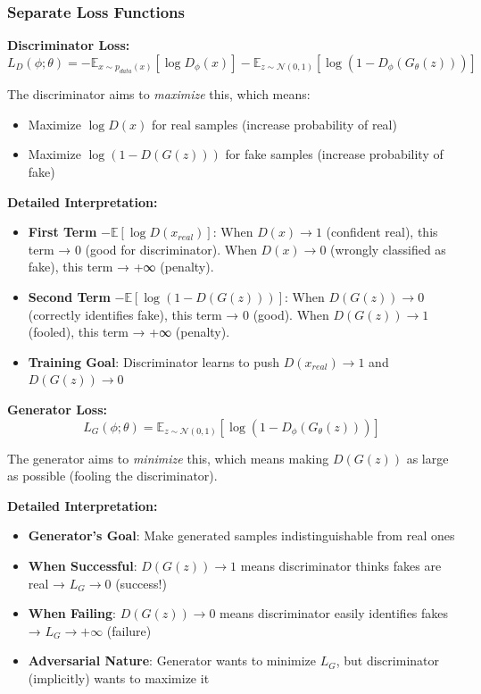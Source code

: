 \documentclass[conference,12pt]{IEEEtran}
\begin{document}
\subsubsection{Separate Loss Functions}

\textbf{Discriminator Loss:}
\begin{equation}
    L_D(\phi; \theta) = - \mathbb{E}_{x \sim p_{data}(x)}[\log D_\phi(x)] - \mathbb{E}_{z \sim \mathcal{N}(0,1)}[\log(1 - D_\phi(G_\theta(z)))]
\end{equation}

The discriminator aims to \textit{maximize} this, which means:
\begin{itemize}
    \item Maximize $\log D(x)$ for real samples (increase probability of real)
    \item Maximize $\log(1-D(G(z)))$ for fake samples (increase probability of fake)
\end{itemize}

\textbf{Detailed Interpretation:}
\begin{itemize}
    \item \textbf{First Term} $-\mathbb{E}[\log D(x_{real})]$: When $D(x) \to 1$ (confident real), this term → 0 (good for discriminator). When $D(x) \to 0$ (wrongly classified as fake), this term → +∞ (penalty).
    \item \textbf{Second Term} $-\mathbb{E}[\log(1-D(G(z)))]$: When $D(G(z)) \to 0$ (correctly identifies fake), this term → 0 (good). When $D(G(z)) \to 1$ (fooled), this term → +∞ (penalty).
    \item \textbf{Training Goal}: Discriminator learns to push $D(x_{real}) \to 1$ and $D(G(z)) \to 0$
\end{itemize}

\textbf{Generator Loss:}
\begin{equation}
    L_G(\phi; \theta) = \mathbb{E}_{z \sim \mathcal{N}(0,1)}[\log(1 - D_\phi(G_\theta(z)))]
\end{equation}

The generator aims to \textit{minimize} this, which means making $D(G(z))$ as large as possible (fooling the discriminator).

\textbf{Detailed Interpretation:}
\begin{itemize}
    \item \textbf{Generator's Goal}: Make generated samples indistinguishable from real ones
    \item \textbf{When Successful}: $D(G(z)) \to 1$ means discriminator thinks fakes are real → $L_G \to 0$ (success!)
    \item \textbf{When Failing}: $D(G(z)) \to 0$ means discriminator easily identifies fakes → $L_G \to +\infty$ (failure)
    \item \textbf{Adversarial Nature}: Generator wants to minimize $L_G$, but discriminator (implicitly) wants to maximize it
\end{itemize}
\end{document}
